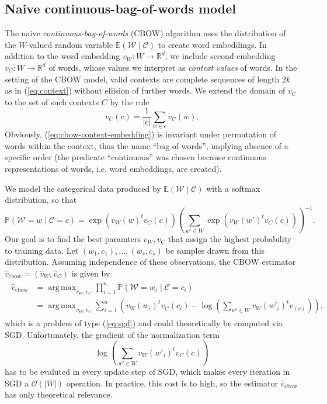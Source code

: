 \documentclass{amsart}
\theoremstyle{plain}
\theoremstyle{definition}
\newcommand{\R}{\mathbb{R}}
\renewcommand{\P}{\mathbb{P}}
\newcommand{\E}{\mathbb{E}}
\DeclareMathOperator*{\argmax}{arg\,max}
\begin{document}
\subsection{Naive continuous-bag-of-words model}
\label{naive-cbow}
The naive \emph{continuous-bag-of-words} (CBOW) algorithm uses the distribution of the $W$-valued random variable $\E(\mathcal{W} \mid \mathcal{C})$ to create word embeddings.
In addition to the word embedding $v_W : W \rightarrow \R^d$, we include second embedding $v_C : W \rightarrow \R^d$ of words, whose values we interpret as \emph{context values} of words.
In the setting of the CBOW model, valid contexts are complete sequences of length $2 k $ as in (\ref{eq:context}) without ellision of further words.
We extend the domain of $v_C$ to the set of such contexts $C$ by the rule
\begin{equation}
  \label{eq:cbow-context-embedding}
  v_C(c) = \frac{1}{|c|} \sum_{w \in c} v_C(w).
\end{equation}
Obviously, (\ref{eq:cbow-context-embedding}) is invariant under permutation of words within the context, thus the name ``bag of words'', implying absence of a specific order (the predicate ``continuous'' was chosen because continuous representations of words, i.e. word embeddings, are created).

We model the categorical data produced by $\E(\mathcal{W} \mid \mathcal{C})$ with a softmax distribution, so that
\begin{equation}
  \label{eq:naive-cbow-model}
  \P(\mathcal{W} = w \mid \mathcal{C} = c) = \exp(v_W(w)^t v_C(c)) \left( \sum_{w' \in W} \exp(v_W(w')^t v_C(c)) \right)^{-1}.
\end{equation}
Our goal is to find the best paramters $v_W, v_C$ that assign the highest probability to training data.
Let $(w_1, c_1), \dots, (w_s, c_s)$ be samples drawn from this distribution.
Assuming independence of these observations, the CBOW estimator $\hat v_{\text{cbow}} = (\hat v_W, \hat v_C)$ is given by
\begin{align}
  \label{eq:cbow-estimator}
  \begin{split}
    \hat v_{\text{cbow}} & = \argmax_{v_W, v_C} \prod_{i = 1}^n \P(\mathcal{W} = w_i \mid \mathcal{C} = c_i) \\
                         & = \argmax_{v_W, v_C} \sum_{i = 1}^n \left( v_W(w_i)^t v_C(c_i) - \log \left( \sum_{w' \in W} v_W(w'_i)^t v_(c) \right) \right),
  \end{split}
\end{align}
which is a problem of type (\ref{eq:sgd}) and could theoretically be computed via SGD.
Unfortunately, the gradient of the normalization term
\begin{equation}
  \label{eq:cbow-normalization}
  \log \left( \sum_{w' \in W} v_W(w'_i)^t v_C(c) \right)
\end{equation}
has to be evaluted in every update step of SGD, which makes every iteration in SGD a $\mathcal{O}(|W|)$ operation.
In practice, this cost is to high, so the estimator $\hat v_{\text{cbow}}$ has only theoretical relevance.
\end{document}
